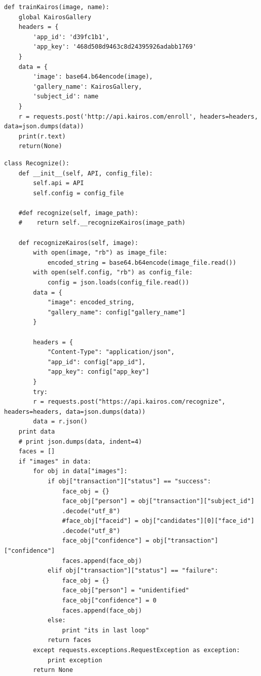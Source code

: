 \documentclass[sigconf]{acmart}
\begin{document}
\begin{lstlisting}
def trainKairos(image, name):
    global KairosGallery
    headers = {
        'app_id': 'd39fc1b1',
        'app_key': '468d508d9463c8d24395926adabb1769'
    }
    data = {
        'image': base64.b64encode(image),
        'gallery_name': KairosGallery,
        'subject_id': name
    }
    r = requests.post('http://api.kairos.com/enroll', headers=headers, data=json.dumps(data))
    print(r.text)
    return(None)
\end{lstlisting}

\begin{lstlisting}
class Recognize():
    def __init__(self, API, config_file):
        self.api = API
        self.config = config_file

    #def recognize(self, image_path):
    #    return self.__recognizeKairos(image_path)
    
    def recognizeKairos(self, image):
        with open(image, "rb") as image_file:
            encoded_string = base64.b64encode(image_file.read())
        with open(self.config, "rb") as config_file:
            config = json.loads(config_file.read())
        data = {
            "image": encoded_string,
            "gallery_name": config["gallery_name"]
        }

        headers = {
            "Content-Type": "application/json",
            "app_id": config["app_id"],
            "app_key": config["app_key"]
        }
        try:
        r = requests.post("https://api.kairos.com/recognize", headers=headers, data=json.dumps(data))
        data = r.json()
    print data
    # print json.dumps(data, indent=4)
    faces = []
    if "images" in data:
        for obj in data["images"]:
            if obj["transaction"]["status"] == "success":
                face_obj = {}
                face_obj["person"] = obj["transaction"]["subject_id"]
                .decode("utf_8")
                #face_obj["faceid"] = obj["candidates"][0]["face_id"]
                .decode("utf_8")
                face_obj["confidence"] = obj["transaction"]["confidence"]
                faces.append(face_obj)
            elif obj["transaction"]["status"] == "failure":
                face_obj = {}
                face_obj["person"] = "unidentified"
                face_obj["confidence"] = 0
                faces.append(face_obj)
            else:
                print "its in last loop"
            return faces
        except requests.exceptions.RequestException as exception:
            print exception
        return None
\end{lstlisting}    
\end{document}
